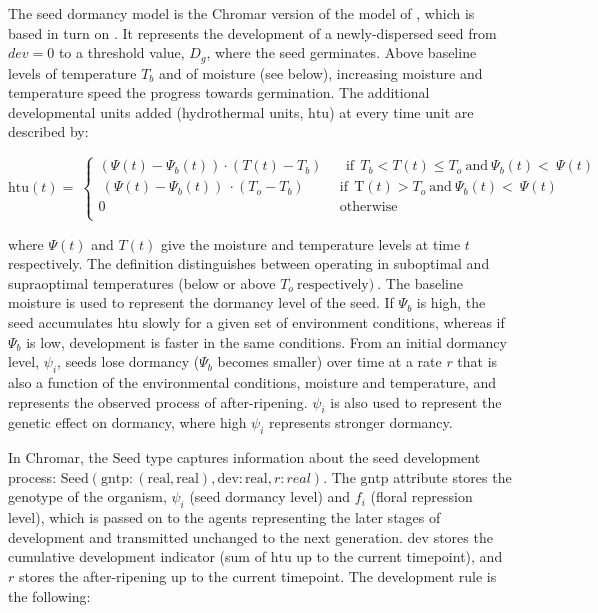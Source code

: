 \documentclass[phd]{infthesis}
\newcommand{\mr}[1]{\mathrm{#1}}
\begin{document}
The seed dormancy model is the Chromar version of the model of
\citet{burghardt_modeling_2015}, which is based in turn on
\citet{alvarado_hydrothermal_2002}. It represents the development of a
newly-dispersed seed from \(dev = 0\) to a threshold value, \(D_{g}\), where the
seed germinates. Above baseline levels of temperature $T_b$
and of moisture (see below), increasing moisture and temperature speed the
progress towards germination. The additional developmental units added
(hydrothermal units, \(\mr{htu}\)) at every time unit are described by:

\[\mr{htu}( t ) = \ \left\{ \begin{matrix}
( \Psi( t ) - \Psi_{b}( t ) ) \cdot ( T( t ) - T_{b} ) \\
\ ( \Psi( t ) - \Psi_{b}( t ) )\  \cdot ( T_{o} - T_{b} ) \\
0 \\
\end{matrix} \right.\ \ \begin{matrix}
\mr{\ \ if\ \ }T_{b} < T( t ) \leq T_{o}\ \mr{and}\ \Psi_{b}( t ) < \ \Psi(t) \\
\mr{if\ \ T}( t ) > T_{o}\ \mr{and}\ \Psi_{b}( t ) < \ \Psi( t ) \\
\mr{otherwise} \\
\end{matrix}\]

where \(\Psi(t)\) and \(T(t)\) give the moisture and temperature levels
at time \(t\) respectively. The definition distinguishes between
operating in suboptimal and supraoptimal temperatures (below or above
\(T_{o}\ \mr{respectively})\ \). The baseline moisture is used to
represent the dormancy level of the seed. If \(\Psi_{b}\) is high, the
seed accumulates htu slowly for a given set of environment conditions,
whereas if \(\Psi_{b}\) is low, development is faster in the same
conditions. From an initial dormancy level, \(\psi_{i}\), seeds lose
dormancy (\(\Psi_{b}\) becomes smaller) over time at a rate $r$
that is also a function of the environmental conditions, moisture and
temperature, and represents the observed process of after-ripening.
\(\psi_{i}\) is also used to represent the genetic effect on dormancy,
where high \(\psi_{i}\) represents stronger dormancy.

In Chromar, the \(\mr{Seed}\) type captures information about the seed
development process:
\(\mr{Seed}(\mr{gntp}:(\mr{real},\mr{real}),\mr{dev}:\mr{real},r:real)\).
The \(\mr{gntp}\) attribute stores the genotype of the organism,
\(\psi_{i}\) (seed dormancy level) and \(f_{i}\) (floral repression
level), which is passed on to the agents representing the later stages
of development and transmitted unchanged to the next generation.
\(\mr{dev}\) stores the cumulative development indicator (sum of
\(\mr{htu}\) up to the current timepoint), and \(r\) stores the
after-ripening up to the current timepoint. The development rule is the
following:
\end{document}
